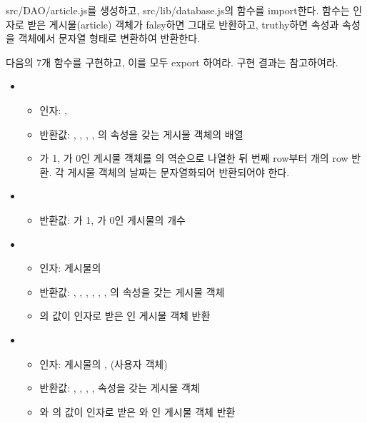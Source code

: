 src/DAO/article.js를 생성하고, src/lib/database.js의  함수를 import한다.  함수는 인자로 받은 게시물(article) 객체가 falsy하면 그대로 반환하고, truthy하면  속성과  속성을  객체에서 문자열 형태로 변환하여 반환한다.

다음의 7개 함수를 구현하고, 이를 모두 export 하여라. 구현 결과는 \를 참고하여라.

\begin{itemize}
    \item {}
    \begin{itemize}
        \item 인자: , 
        \item 반환값: , , , , 의  속성을 갖는 게시물 객체의 배열
        \item {}가 1, 가 0인 게시물 객체를 의 역순으로 나열한 뒤 번째 row부터 개의 row 반환. 각 게시물 객체의 날짜는 문자열화되어 반환되어야 한다.
    \end{itemize}
    \item {}
    \begin{itemize}
        \item 반환값: 가 1, 가 0인 게시물의 개수
    \end{itemize}
    \item {}
    \begin{itemize}
        \item 인자: 게시물의 
        \item 반환값: , , , , , , 의  속성을 갖는 게시물 객체
        \item {}의 값이 인자로 받은 인 게시물 객체 반환
    \end{itemize}
    \item {}
    \begin{itemize}
        \item 인자: 게시물의 ,  (사용자 객체)
        \item 반환값: , , , ,  속성을 갖는 게시물 객체
        \item {}와 의 값이 인자로 받은 와 인 게시물 객체 반환

\end{itemize}
\end{itemize}
